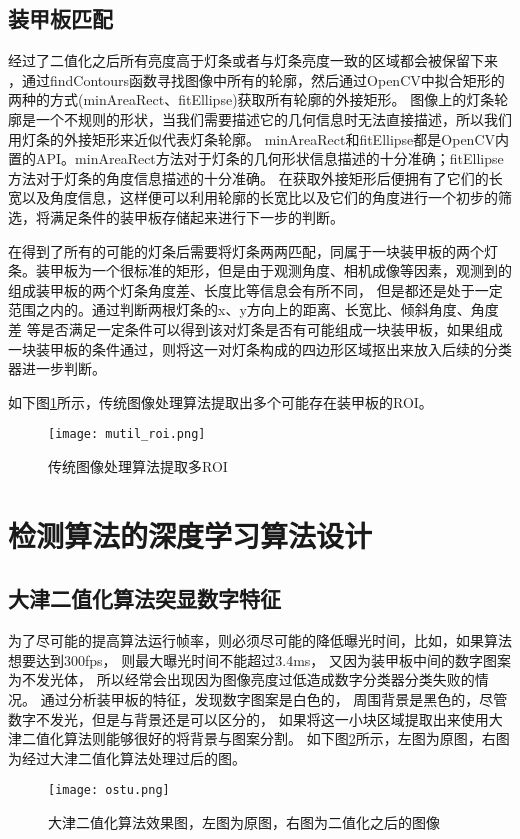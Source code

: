 \subsection{装甲板匹配}

经过了二值化之后所有亮度高于灯条或者与灯条亮度一致的区域都会被保留下来
，通过findContours函数寻找图像中所有的轮廓，然后通过OpenCV中拟合矩形的两种的方式(minAreaRect、fitEllipse)获取所有轮廓的外接矩形。
图像上的灯条轮廓是一个不规则的形状，当我们需要描述它的几何信息时无法直接描述，所以我们用灯条的外接矩形来近似代表灯条轮廓。
minAreaRect和fitEllipse都是OpenCV内置的API。minAreaRect方法对于灯条的几何形状信息描述的十分准确；fitEllipse方法对于灯条的角度信息描述的十分准确。
在获取外接矩形后便拥有了它们的长宽以及角度信息，这样便可以利用轮廓的长宽比以及它们的角度进行一个初步的筛选，将满足条件的装甲板存储起来进行下一步的判断。\par


在得到了所有的可能的灯条后需要将灯条两两匹配，同属于一块装甲板的两个灯条。装甲板为一个很标准的矩形，但是由于观测角度、相机成像等因素，观测到的组成装甲板的两个灯条角度差、长度比等信息会有所不同，
但是都还是处于一定范围之内的。通过判断两根灯条的x、y方向上的距离、长宽比、倾斜角度、角度差
等是否满足一定条件可以得到该对灯条是否有可能组成一块装甲板，如果组成一块装甲板的条件通过，则将这一对灯条构成的四边形区域抠出来放入后续的分类器进一步判断。\par
如下图\ref{传统图像处理算法提取多ROI}所示，传统图像处理算法提取出多个可能存在装甲板的ROI。

\begin{figure}[H]
    \centering
    \texttt{[image: mutil\_roi.png]} 
    \caption{传统图像处理算法提取多ROI} 
    \label{传统图像处理算法提取多ROI}
\end{figure}





\section{检测算法的深度学习算法设计}
\subsection{大津二值化算法突显数字特征}
为了尽可能的提高算法运行帧率，则必须尽可能的降低曝光时间，比如，如果算法想要达到300fps，
则最大曝光时间不能超过3.4ms，
又因为装甲板中间的数字图案为不发光体，
所以经常会出现因为图像亮度过低造成数字分类器分类失败的情况。
通过分析装甲板的特征，发现数字图案是白色的，
周围背景是黑色的，尽管数字不发光，但是与背景还是可以区分的，
如果将这一小块区域提取出来使用大津二值化算法\cite{1979A}则能够很好的将背景与图案分割。
如下图\ref{ostu}所示，左图为原图，右图为经过大津二值化算法处理过后的图。
\begin{figure}[H]
    \centering
    \texttt{[image: ostu.png]} 
    \caption{大津二值化算法效果图，左图为原图，右图为二值化之后的图像} 
    \label{ostu}
\end{figure}




